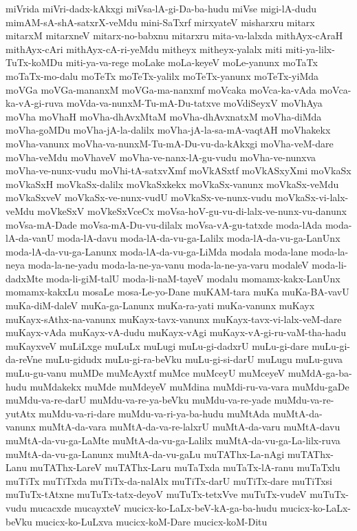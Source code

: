 {miVrida
miVri-dadx-kAkxgi
miVsa-lA-gi-Da-ba-hudu
miVse
migi-lA-dudu
mimAM-sA-shA-satxrX-veMdu
mini-SaTxrf
mirxyateV
misharxru
mitarx
mitarxM
mitarxneV
mitarx-no-babxnu
mitarxru
mita-va-lalxda
mithAyx-cAraH
mithAyx-cAri
mithAyx-cA-ri-yeMdu
mitheyx
mitheyx-yalalx
miti
miti-ya-lilx-TuTx-koMDu
miti-ya-va-rege
moLake
moLa-keyeV
moLe-yanunx
moTaTx
moTaTx-mo-dalu
moTeTx
moTeTx-yalilx
moTeTx-yanunx
moTeTx-yiMda
moVGa
moVGa-mananxM
moVGa-ma-nanxmf
moVcaka
moVca-ka-vAda
moVca-ka-vA-gi-ruva
moVda-va-nunxM-Tu-mA-Du-tatxve
moVdiSeyxV
moVhAya
moVha
moVhaH
moVha-dhAvxMtaM
moVha-dhAvxnatxM
moVha-diMda
moVha-goMDu
moVha-jA-la-dalilx
moVha-jA-la-sa-mA-vaqtAH
moVhakekx
moVha-vanunx
moVha-va-nunxM-Tu-mA-Du-vu-da-kAkxgi
moVha-veM-dare
moVha-veMdu
moVhaveV
moVha-ve-nanx-lA-gu-vudu
moVha-ve-nunxva
moVha-ve-nunx-vudu
moVhi-tA-satxvXmf
moVkASxtf
moVkASxyXmi
moVkaSx
moVkaSxH
moVkaSx-dalilx
moVkaSxkekx
moVkaSx-vanunx
moVkaSx-veMdu
moVkaSxveV
moVkaSx-ve-nunx-vudU
moVkaSx-ve-nunx-vudu
moVkaSx-vi-lalx-veMdu
moVkeSxV
moVkeSxVceCx
moVsa-hoV-gu-vu-di-lalx-ve-nunx-vu-danunx
moVsa-mA-Dade
moVsa-mA-Du-vu-dilalx
moVsa-vA-gu-tatxde
moda-lAda
moda-lA-da-vanU
moda-lA-davu
moda-lA-da-vu-ga-Lalilx
moda-lA-da-vu-ga-LanUnx
moda-lA-da-vu-ga-Lanunx
moda-lA-da-vu-ga-LiMda
modala
moda-lane
moda-la-neya
moda-la-ne-yadu
moda-la-ne-ya-vanu
moda-la-ne-ya-varu
modaleV
moda-li-dadxMte
moda-li-giM-talU
moda-li-naM-tayeV
modalu
momamx-kakx-LanUnx
momamx-kakxLu
mosaLe
mosa-Le-yo-Dane
muKAM-tara
muKa
muKa-BA-vavU
muKa-diM-daleV
muKa-ga-Lanunx
muKa-ra-yati
muKa-vanunx
muKayx
muKayx-sAthx-na-vanunx
muKayx-tavx-vanunx
muKayx-tavx-vi-lalx-veM-dare
muKayx-vAda
muKayx-vA-dudu
muKayx-vAgi
muKayx-vA-gi-ru-vaM-tha-hadu
muKayxveV
muLiLxge
muLuLx
muLugi
muLu-gi-dadxrU
muLu-gi-dare
muLu-gi-da-reVne
muLu-gidudx
muLu-gi-ra-beVku
muLu-gi-si-darU
muLugu
muLu-guva
muLu-gu-vanu
muMDe
muMcAyxtf
muMce
muMceyU
muMceyeV
muMdA-ga-ba-hudu
muMdakekx
muMde
muMdeyeV
muMdina
muMdi-ru-va-vara
muMdu-gaDe
muMdu-va-re-darU
muMdu-va-re-ya-beVku
muMdu-va-re-yade
muMdu-va-re-yutAtx
muMdu-va-ri-dare
muMdu-va-ri-ya-ba-hudu
muMtAda
muMtA-da-vanunx
muMtA-da-vara
muMtA-da-va-re-lalxrU
muMtA-da-varu
muMtA-davu
muMtA-da-vu-ga-LaMte
muMtA-da-vu-ga-Lalilx
muMtA-da-vu-ga-La-lilx-ruva
muMtA-da-vu-ga-Lanunx
muMtA-da-vu-gaLu
muTAThx-La-nAgi
muTAThx-Lanu
muTAThx-LareV
muTAThx-Laru
muTaTxda
muTaTx-lA-ranu
muTaTxlu
muTiTx
muTiTxda
muTiTx-da-nalAlx
muTiTx-darU
muTiTx-dare
muTiTxsi
muTuTx-tAtxne
muTuTx-tatx-deyoV
muTuTx-tetxVve
muTuTx-vudeV
muTuTx-vudu
mucacxde
mucayxteV
mucicx-ko-LaLx-beV-kA-ga-ba-hudu
mucicx-ko-LaLx-beVku
mucicx-ko-LuLxva
mucicx-koM-Dare
mucicx-koM-Ditu
}

